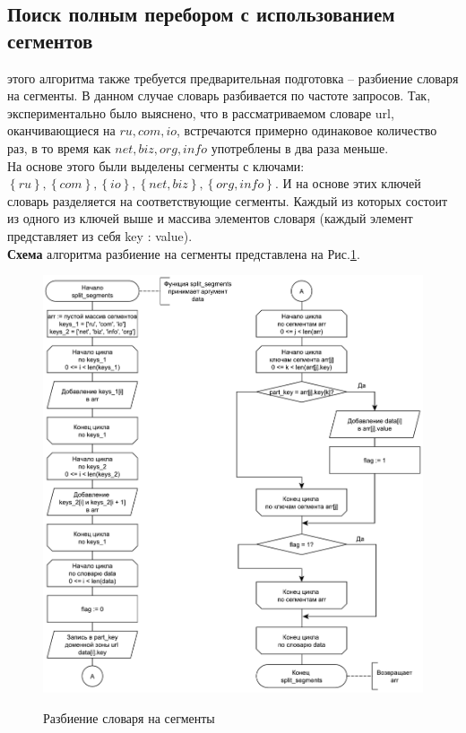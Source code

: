 \subsection{Поиск полным перебором с использованием сегментов}
 этого алгоритма также требуется предварительная подготовка -- разбиение словаря на сегменты. В данном случае словарь разбивается по частоте запросов. Так, экспериментально было выяснено, что в рассматриваемом словаре url, оканчивающиеся на $ru, com, io$, встречаются примерно одинаковое количество раз,  в то время как $net, biz, org, info$ употреблены в два раза меньше. \\

На основе этого были выделены сегменты с ключами: $\left\{ ru \right\}, \left\{ com \right\}, \left\{ io \right\}, \left\{ net, biz \right\}, \left\{ org, info \right\}$. И на основе этих ключей словарь разделяется на соответствующие сегменты. Каждый из которых состоит из одного из ключей выше и массива элементов словаря (каждый элемент представляет из себя key : value).\\

\textbf{Схема} алгоритма разбиение на сегменты представлена на Рис.\ref{fig3:image}.\\

\newpage

\begin{figure}[pt!]
	\begin{center}
		{\includegraphics[scale = 0.6]{schemes/split}}
		\caption{Разбиение словаря на сегменты}
		\label{fig3:image}
	\end{center}
\end{figure}

